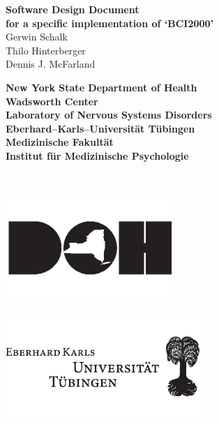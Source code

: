 \begin{titlepage}
\hspace{-7mm}
\begin{minipage}{\textwidth}
\begin{center}
\vspace{.5cm}
{\huge \bf Software Design Document\\[1.5ex]}
{\large \bf for a specific implementation of `BCI2000'}
\\[1.5cm]
{\Large Gerwin Schalk\\}
{\Large Thilo Hinterberger\\}
{\Large Dennis J. McFarland\\[1.5cm]}
%
\begin{minipage}{13cm}
  \begin{minipage}[c]{13cm}
    \begin{center}
      {\Large \bf New York State Department of Health\\[2ex]}
      {\large \bf Wadsworth Center\\[0.5ex]
       Laboratory of Nervous Systems Disorders\\[4ex]}
      {\Large \bf Eberhard--Karls--Universit\"at T\"ubingen\\[2ex]}
      {\large \bf Medizinische Fakult\"at\\[0.5ex]
       Institut f\"ur Medizinische Psychologie\\[0.5ex]}
    \end{center}
  \end{minipage}
  \\[1.0cm]
  \begin{minipage}[c]{6cm}
    \centerline{\includegraphics{figures/DOHlogo}}
  \end{minipage}
  \hspace{1.5cm}
  \begin{minipage}[c]{3cm}
    \centerline{\includegraphics{figures/EKUlogo}}

\end{minipage}
\end{minipage}
\end{center}
\end{minipage}
\end{titlepage}
